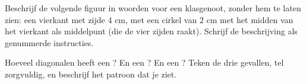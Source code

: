 \begin{exercise}[$\star\star$]\label{exo:g4:geometry:10}
Beschrijf de volgende figuur in woorden voor een klasgenoot, zonder hem te
laten zien: een vierkant met zijde $4$ cm, met een cirkel van  $2$ cm
met het midden van het vierkant als middelpunt (die de vier zijden raakt).
Schrijf de beschrijving als genummerde instructies.
\end{exercise}

\begin{exercise}[$\star\star$]\label{exo:g4:geometry:11}
Hoeveel diagonalen heeft een ? En een ? En een ?
Teken de drie gevallen, tel zorgvuldig, en beschrijf het patroon dat je
ziet.
\end{exercise}
